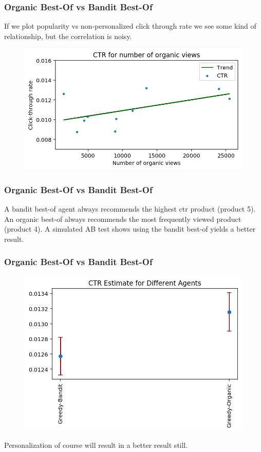 \begin{frame}
\frametitle{Organic Best-Of vs Bandit Best-Of}

If we plot popularity vs non-personalized click through rate we see some kind of relationship, but the correlation is noisy.


\begin{figure}[h!]
\includegraphics[scale=0.4]{images/organic_bestof3.png}
\centering
\label{motex1}
\end{figure}
\end{frame}

\begin{frame}
\frametitle{Organic Best-Of vs Bandit Best-Of}

A bandit best-of agent always recommends the highest ctr product (product 5).  An organic best-of always recommends the most frequently viewed product (product 4).  A simulated AB test shows using the bandit best-of yields a better result.

\end{frame}

\begin{frame}
\frametitle{Organic Best-Of vs Bandit Best-Of}
  
\begin{figure}[h!]
\includegraphics[scale=0.4]{images/organic_bestof4.png}
\centering
\label{motex1}
\end{figure}

\pause
Personalization of course will result in a better result still.
\end{frame}


